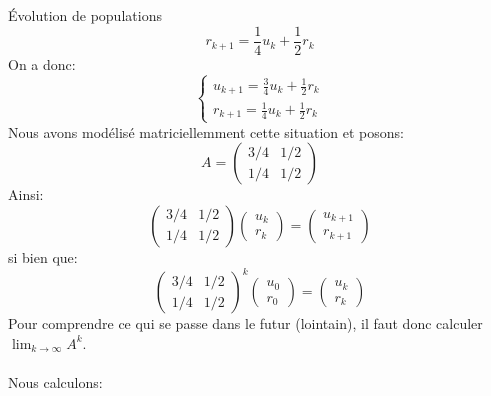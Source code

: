 \begin{parag}{Évolution de populations}
    \[r_{k+1} = \frac{1}{4}u_k + \frac{1}{2}r_k\]
    On a donc:
    \[\begin{cases}
        u_{k+1} = \frac{3}{4}u_k + \frac{1}{2}r_k\\
        r_{k+1} = \frac{1}{4}u_k + \frac{1}{2}r_k
    \end{cases}\]
    Nous avons modélisé matriciellemment cette situation et posons:
\[A = \begin{pmatrix}
    3/4 & 1/2\\ 1/4 & 1/2
\end{pmatrix}\]
Ainsi:
\[\begin{pmatrix}
    3/4 & 1/2\\ 1/4 & 1/2
\end{pmatrix}\begin{pmatrix}
    u_k \\ r_k
\end{pmatrix} = \begin{pmatrix}
    u_{k+1}\\ r_{k+1}
\end{pmatrix}\]
si bien que:
\[\begin{pmatrix}
    3/4 & 1/2\\ 1/4 & 1/2
\end{pmatrix}^k\begin{pmatrix}
    u_0\\r_0
\end{pmatrix} = \begin{pmatrix}
    u_k \\ r_k
\end{pmatrix}\]
Pour comprendre ce qui se passe dans le futur (lointain), il faut donc calculer $\lim_{k \to \infty} A^k$.
\\
\\
Nous calculons:
\end{parag}
